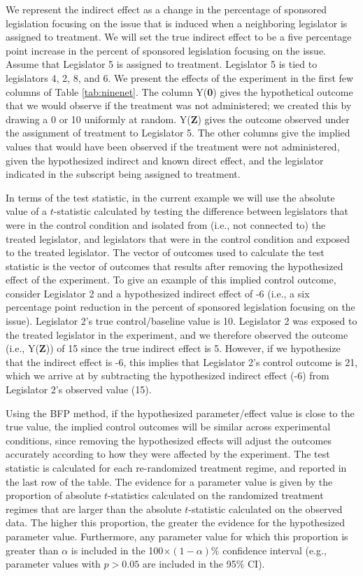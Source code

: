 \documentclass[12pt]{article}
\begin{document}
We represent the indirect effect as a change in the percentage of sponsored legislation focusing on the issue that is induced when a neighboring legislator is assigned to treatment. We will set the true indirect effect to be a five percentage point increase in the percent of sponsored legislation focusing on the issue. Assume that Legislator 5 is assigned to treatment. Legislator 5 is tied to legislators 4, 2, 8, and 6. We present the effects of the experiment in the first few columns of Table \ref{tab:ninenet}. The column Y({\bf 0}) gives the hypothetical outcome that we would observe if the treatment was not administered; we created this by drawing a 0 or 10 uniformly at random. Y({\bf Z}) gives the outcome observed under the assignment of treatment to Legislator 5. The other columns give the implied values that would have been observed if the treatment were not administered, given the hypothesized indirect and known direct effect, and the legislator indicated in the subscript being assigned to treatment. 

In terms of the test statistic, in the current example we will use the absolute value of a $t$-statistic calculated by testing the difference between legislators that were in the control condition and isolated from (i.e., not connected to) the treated legislator, and legislators that were in the control condition and exposed to the treated legislator. The vector of outcomes used to calculate the test statistic is the vector of outcomes that results after removing the hypothesized effect of the experiment. To give an example of this implied control outcome, consider Legislator 2 and a hypothesized indirect effect of -6 (i.e., a six percentage point reduction in the percent of sponsored legislation focusing on the issue). Legislator 2's true control/baseline value is 10. Legislator 2 was exposed to the treated legislator in the experiment, and we therefore observed the outcome (i.e., Y({\bf Z})) of 15 since the true indirect effect is 5. However, if we hypothesize that the indirect effect is -6, this implies that Legislator 2's control outcome is 21, which we arrive at by subtracting the hypothesized indirect effect (-6) from Legislator 2's observed value (15). 

Using the BFP method, if the hypothesized parameter/effect value is close to the true value, the implied control outcomes will be similar across experimental conditions, since removing the hypothesized effects will adjust the outcomes accurately according to how they were affected by the experiment. The test statistic is calculated for each re-randomized treatment regime, and reported in the last row of the table. The evidence for a parameter value is given by the proportion of absolute $t$-statistics calculated on the randomized treatment regimes that are larger than the absolute $t$-statistic calculated on the observed data. The higher this proportion, the greater the evidence for the hypothesized parameter value. Furthermore, any parameter value for which this proportion is greater than $\alpha$ is included in the 100$\times(1-\alpha)\%$ confidence interval (e.g., parameter values with $p > 0.05$ are included in the 95\% CI). 
\end{document}
